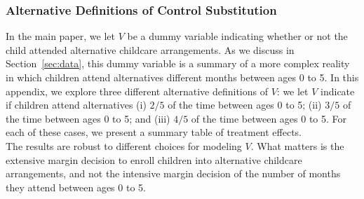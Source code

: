 \subsubsection{Alternative Definitions of Control Substitution}
\label{appendix:vsensitivity-controlsub}

\noindent In the main paper, we let $V$ be a dummy variable indicating whether or not the child attended alternative childcare arrangements. As we discuss in Section~\ref{sec:data}, this dummy variable is a summary of a more complex reality in which children attend alternatives different months between ages 0 to 5. In this appendix, we explore three different alternative definitions of $V$: we let $V$ indicate if children attend alternatives (i) $2/5$ of the time between ages 0 to 5; (ii) $3/5$ of the time between ages 0 to 5; and (iii) $4/5$ of the time between ages 0 to 5. For each of these cases, we present a summary table of treatment effects.\\

\noindent The results are robust to different choices for modeling $V$. What matters is the extensive margin decision to enroll children into alternative childcare arrangements, and not the intensive margin decision of the number of months they attend between ages 0 to 5.

